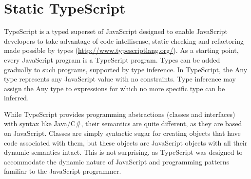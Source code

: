 \section{Static TypeScript}
\label{sec:sts}

TypeScript is a typed superset of JavaScript designed to enable JavaScript developers to take advantage of code 
intellisense, static checking and refactoring made possible by types (\url{http://www.typescriptlang.org/}). 
As a starting point, every JavaScript program is a TypeScript program.  Types can be added gradually to such programs, 
supported by type inference. In TypeScript, the Any type 
represents any JavaScript value with no constraints. Type inference may assign the Any type to expressions for which 
no more specific type can be inferred.

While TypeScript provides programming abstractions (classes and interfaces) with syntax like Java/C\#, their semantics
are quite different, as they are based on JavaScript.  Classes are simply syntactic sugar for creating objects that
have code associated with them, but these objects are JavaScript objects with all their dynamic semantics intact. This
is not surprising, as TypeScript was designed to accommodate the dynamic nature of JavaScript and programming patterns
familiar to the JavaScript programmer. 

